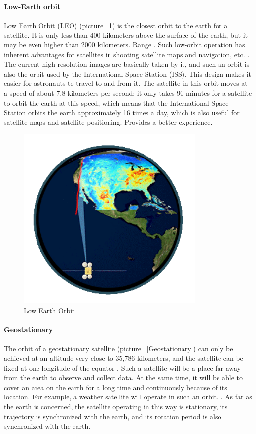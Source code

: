 \documentclass[conference]{IEEEtran}
\begin{document}
\paragraph{Low-Earth orbit}

Low Earth Orbit (LEO) (picture ~\ref{LEO}) is the closest orbit to the earth for a satellite. It is only less than 400 kilometers above the surface of the earth, but it may be even higher than 2000 kilometers. Range \cite{WhatisRe36:online}. Such low-orbit operation has inherent advantages for satellites in shooting satellite maps and navigation, etc. \cite{earthdata28:online}. The current high-resolution images are basically taken by it, and such an orbit is also the orbit used by the International Space Station (ISS). This design makes it easier for astronauts to travel to and from it. The satellite in this orbit moves at a speed of about 7.8 kilometers per second; it only takes 90 minutes for a satellite to orbit the earth at this speed, which means that the International Space Station orbits the earth approximately 16 times a day, which is also useful for satellite maps and satellite positioning. Provides a better experience\cite{ESAkerne12:online}.

\begin{figure}[htbp]
    \centerline{\includegraphics[width=260pt]{images/1.1.2.png}}
    \caption{Low Earth Orbit}
    \label{LEO}
\end{figure}


\paragraph{Geostationary}
The orbit of a geostationary satellite (picture ~\ref{Geostationary}) can only be achieved at an altitude very close to 35,786 kilometers, and the satellite can be fixed at one longitude of the equator \cite{Synchron89:online}. Such a satellite will be a place far away from the earth to observe and collect data. At the same time, it will be able to cover an area on the earth for a long time and continuously because of its location. For example, a weather satellite will operate in such an orbit. \Cite{WhatisRe36:online}. As far as the earth is concerned, the satellite operating in this way is stationary, its trajectory is synchronized with the earth, and its rotation period is also synchronized with the earth\cite{CelesTra70:online}.
\end{document}
